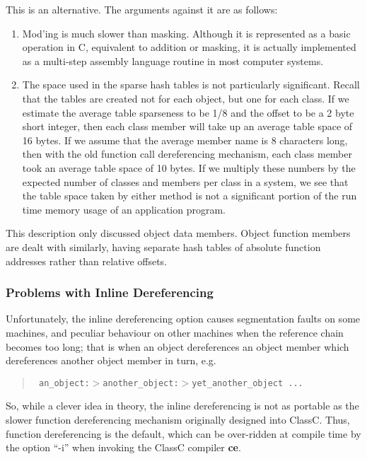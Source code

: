 This is an alternative.  The arguments against it are as follows:
\begin{enumerate}
\item Mod'ing is much slower than masking.  Although it is represented as
a basic operation in C, equivalent to addition or masking, it is
actually implemented as a multi-step assembly language routine
in most computer systems.
\item The space used in the sparse hash tables is not particularly significant.
Recall that the tables are created not for each object, but one for each
class.  If we estimate the average table sparseness to be 1/8 and the
offset to be a 2 byte short integer, then each class member will take up
an average table space of 16 bytes.  If we assume that the average 
member name is 8 characters long, then with the old function call
dereferencing mechanism, each class member took an average table space
of 10 bytes.  If we multiply these numbers by the expected number
of classes and members per class in a system, we see that the table
space taken by either method is not a significant portion of the 
run time memory usage of an application program.
\end{enumerate}

This description only discussed object data members.  Object function
members are dealt with similarly, having separate hash tables of
absolute function addresses rather than relative offsets.

\subsubsection{Problems with Inline Dereferencing}
Unfortunately, the inline dereferencing option causes segmentation
faults on some machines, and peculiar behaviour on other machines
when the reference chain becomes too long; that is when an object
dereferences an object member which dereferences another object member
in turn, e.g.
\begin{quote} \tt
an\_object:$>$another\_object:$>$yet\_another\_object ...
\end{quote}

So, while a clever idea in theory, the inline dereferencing is 
not as portable as the slower function dereferencing mechanism
originally designed into ClassC.  Thus, function dereferencing is
the default, which can be over-ridden at compile time by 
the option ``-i'' when invoking the ClassC compiler {\bf ce}.
